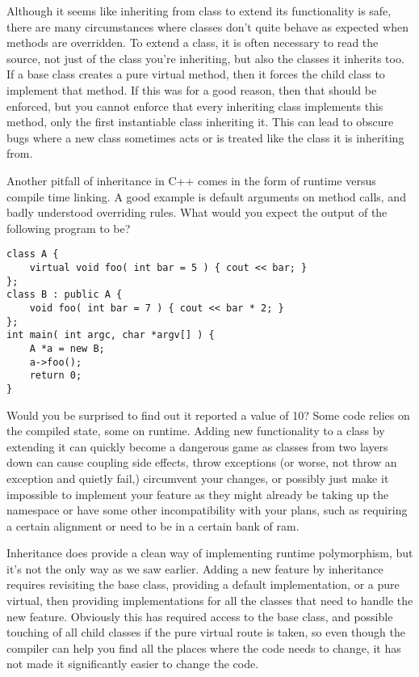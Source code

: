 Although it seems like inheriting from class to extend its functionality is
safe, there are many circumstances where classes don't quite behave as expected
when methods are overridden. To extend a class, it is often necessary to read
the source, not just of the class you're inheriting, but also the classes it
inherits too. If a base class creates a pure virtual method, then it forces the
child class to implement that method. If this was for a good reason, then that
should be enforced, but you cannot enforce that every inheriting class
implements this method, only the first instantiable class inheriting it. This
can lead to obscure bugs where a new class sometimes acts or is treated like
the class it is inheriting from.

Another pitfall of inheritance in C++ comes in the form of runtime versus
compile time linking. A good example is default arguments on method calls, and
badly understood overriding rules. What would you expect the output of the
following program to be?

\begin{lstlisting}
class A {
	virtual void foo( int bar = 5 ) { cout << bar; }
};
class B : public A {
	void foo( int bar = 7 ) { cout << bar * 2; }
};
int main( int argc, char *argv[] ) {
	A *a = new B;
	a->foo();
	return 0;
}
\end{lstlisting}

Would you be surprised to find out it reported a value of 10? Some code relies
on the compiled state, some on runtime. Adding new functionality to a class by
extending it can quickly become a dangerous game as classes from two layers
down can cause coupling side effects, throw exceptions (or worse, not throw an
exception and quietly fail,) circumvent your changes, or possibly just make it
impossible to implement your feature as they might already be taking up the
namespace or have some other incompatibility with your plans, such as requiring
a certain alignment or need to be in a certain bank of ram.

Inheritance does provide a clean way of implementing runtime polymorphism, but
it's not the only way as we saw earlier. Adding a new feature by inheritance
requires revisiting the base class, providing a default implementation, or a
pure virtual, then providing implementations for all the classes that need to
handle the new feature. Obviously this has required access to the base class,
and possible touching of all child classes if the pure virtual route is taken,
so even though the compiler can help you find all the places where the code
needs to change, it has not made it significantly easier to change the code.

